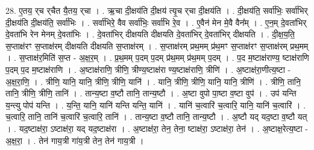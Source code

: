 \documentclass[17pt]{extarticle}
\begin{document}
28. ए॒तय॒ र्‌च र्‌चैत यै॒तय॒ र्‌चा । . ऋ॒चा दी॒क्षय॑ति दी॒क्षय॑ त्यृ॒च र्‌चा दी॒क्षय॑ति । . दी॒क्षय॑ति॒ सर्वा॑भिः॒ सर्वा॑भिर् दी॒क्षय॑ति दी॒क्षय॑ति॒ सर्वा॑भिः । . सर्वा॑भिरे॒ वैव सर्वा॑भिः॒ सर्वा॑भि रे॒व । . ए॒वैन॑ मेन मे॒वै वैन᳚म् । . ए॒न॒म् दे॒वता॑भिर् दे॒वता॑भि रेन मेनम् दे॒वता॑भिः । . दे॒वता॑भिर् दीक्षयति दीक्षयति दे॒वता॑भिर् दे॒वता॑भिर् दीक्षयति । . दी॒क्ष॒य॒ति॒ स॒प्ताक्ष॑रꣳ स॒प्ताक्ष॑रम् दीक्षयति दीक्षयति स॒प्ताक्ष॑रम् । . स॒प्ताक्ष॑रम् प्रथ॒मम् प्र॑थ॒मꣳ स॒प्ताक्ष॑रꣳ स॒प्ताक्ष॑रम् प्रथ॒मम् । . स॒प्ताक्ष॑र॒मिति॑ स॒प्त - अ॒क्ष॒र॒म् । . प्र॒थ॒मम् प॒दम् प॒दम् प्र॑थ॒मम् प्र॑थ॒मम् प॒दम् । . प॒द म॒ष्टाक्ष॑राण्य॒ ष्टाक्ष॑राणि प॒दम् प॒द म॒ष्टाक्ष॑राणि । . अ॒ष्टाक्ष॑राणि॒ त्रीणि॒ त्रीण्य॒ष्टाक्ष॑रा ण्य॒ष्टाक्ष॑राणि॒ त्रीणि॑ । . अ॒ष्टाक्ष॑रा॒णीत्य॒ष्टा - अ॒क्ष॒रा॒णि॒ । . त्रीणि॒ यानि॒ यानि॒ त्रीणि॒ त्रीणि॒ यानि॑ । . यानि॒ त्रीणि॒ त्रीणि॒ यानि॒ यानि॒ त्रीणि॑ । . त्रीणि॒ तानि॒ तानि॒ त्रीणि॒ त्रीणि॒ तानि॑ । . तान्य॒ष्टा व॒ष्टौ तानि॒ तान्य॒ष्टौ । . अ॒ष्टा वुपो पा॒ष्टा व॒ष्टा वुप॑ । . उप॑ यन्ति य॒न्त्यु पोप॑ यन्ति । . य॒न्ति॒ यानि॒ यानि॑ यन्ति यन्ति॒ यानि॑ । . यानि॑ च॒त्वारि॑ च॒त्वारि॒ यानि॒ यानि॑ च॒त्वारि॑ । . च॒त्वारि॒ तानि॒ तानि॑ च॒त्वारि॑ च॒त्वारि॒ तानि॑ । . तान्य॒ष्टा व॒ष्टौ तानि॒ तान्य॒ष्टौ । . अ॒ष्टौ यद् यद॒ष्टा व॒ष्टौ यत् । . यद॒ष्टाक्ष॑रा॒ ऽष्टाक्ष॑रा॒ यद् यद॒ष्टाक्ष॑रा । . अ॒ष्टाक्ष॑रा॒ तेन॒ तेना॒ ष्टाक्ष॑रा॒ ऽष्टाक्ष॑रा॒ तेन॑ । . अ॒ष्टाक्ष॒रेत्य॒ष्टा - अ॒क्ष॒रा॒ । . तेन॑ गाय॒त्री गा॑य॒त्री तेन॒ तेन॑ गाय॒त्री । \newline
\end{document}
